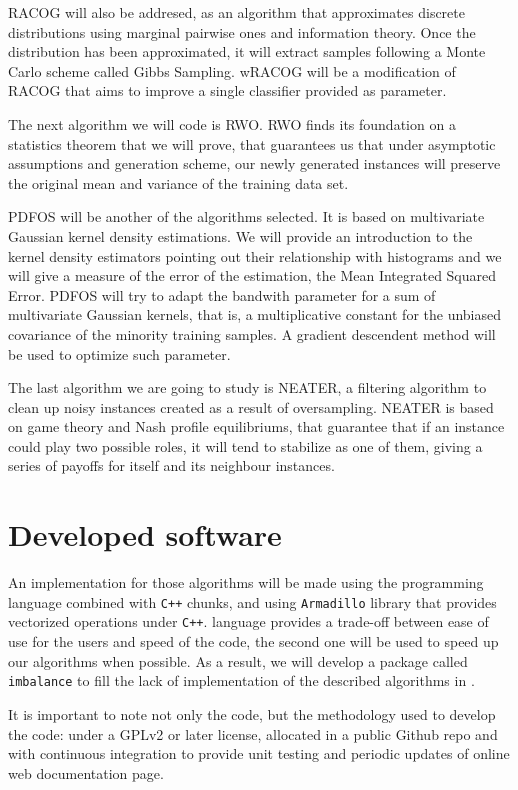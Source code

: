 RACOG will also be addresed, as an algorithm that approximates discrete distributions using marginal pairwise ones and 
information theory. Once the distribution has been approximated, it will extract samples following a Monte Carlo scheme
called Gibbs Sampling. wRACOG will be a modification of RACOG that aims to improve a single classifier provided as parameter.

The next algorithm we will code is RWO. RWO finds its foundation on a statistics theorem that we will prove, that guarantees
us that under asymptotic assumptions and generation scheme, our newly generated instances will preserve the original mean
and variance of the training data set.

PDFOS will be another of the algorithms selected. It is based on multivariate Gaussian kernel density estimations. We will
provide an introduction to the kernel density estimators pointing out their relationship with histograms and we will give
a measure of the error of the estimation, the Mean Integrated Squared Error. PDFOS will try to adapt the bandwith parameter
for a sum of multivariate Gaussian kernels, that is, a multiplicative constant for the unbiased covariance of the minority
training samples. A gradient descendent method will be used to optimize such parameter.

The last algorithm we are going to study is NEATER, a filtering algorithm to clean up noisy instances created as a result of
oversampling. NEATER is based on game theory and Nash profile equilibriums, that guarantee that if an instance could play
two possible roles, it will tend to stabilize as one of them, giving a series of payoffs for itself and its neighbour 
instances.

\section*{Developed software}
An implementation for those algorithms will be made using the \R programming language combined with \texttt{C++} chunks, and 
using \texttt{Armadillo} library that provides vectorized operations under \texttt{C++}. \R language provides a trade-off 
between ease of use for the users and speed of the code, the second one will be used to speed up our algorithms when 
possible. As a result, we will develop a package called \texttt{imbalance} to fill the lack of implementation of the 
described algorithms in \R.

It is important to note not only the code, but the methodology used to develop the code: under a GPLv2 or later license,
allocated in a public Github repo and with continuous integration to provide unit testing and periodic updates of
online web documentation page.

